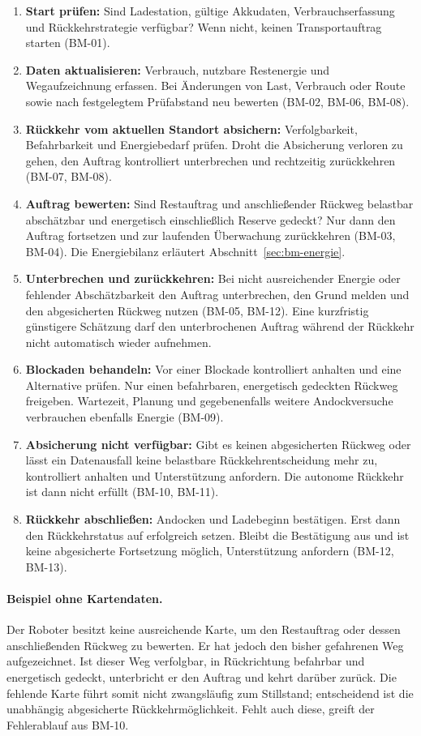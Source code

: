 \begin{enumerate}
    \item \textbf{Start prüfen:} Sind Ladestation, gültige Akkudaten, Verbrauchserfassung und Rückkehrstrategie verfügbar? Wenn nicht, keinen Transportauftrag starten (BM-01).
    \item \textbf{Daten aktualisieren:} Verbrauch, nutzbare Restenergie und Wegaufzeichnung erfassen. Bei Änderungen von Last, Verbrauch oder Route sowie nach festgelegtem Prüfabstand neu bewerten (BM-02, BM-06, BM-08).
    \item \textbf{Rückkehr vom aktuellen Standort absichern:} Verfolgbarkeit, Befahrbarkeit und Energiebedarf prüfen. Droht die Absicherung verloren zu gehen, den Auftrag kontrolliert unterbrechen und rechtzeitig zurückkehren (BM-07, BM-08).
    \item \textbf{Auftrag bewerten:} Sind Restauftrag und anschließender Rückweg belastbar abschätzbar und energetisch einschließlich Reserve gedeckt? Nur dann den Auftrag fortsetzen und zur laufenden Überwachung zurückkehren (BM-03, BM-04). Die Energiebilanz erläutert Abschnitt~\ref{sec:bm-energie}.
    \item \textbf{Unterbrechen und zurückkehren:} Bei nicht ausreichender Energie oder fehlender Abschätzbarkeit den Auftrag unterbrechen, den Grund melden und den abgesicherten Rückweg nutzen (BM-05, BM-12). Eine kurzfristig günstigere Schätzung darf den unterbrochenen Auftrag während der Rückkehr nicht automatisch wieder aufnehmen.
    \item \textbf{Blockaden behandeln:} Vor einer Blockade kontrolliert anhalten und eine Alternative prüfen. Nur einen befahrbaren, energetisch gedeckten Rückweg freigeben. Wartezeit, Planung und gegebenenfalls weitere Andockversuche verbrauchen ebenfalls Energie (BM-09).
    \item \textbf{Absicherung nicht verfügbar:} Gibt es keinen abgesicherten Rückweg oder lässt ein Datenausfall keine belastbare Rückkehrentscheidung mehr zu, kontrolliert anhalten und Unterstützung anfordern. Die autonome Rückkehr ist dann nicht erfüllt (BM-10, BM-11).
    \item \textbf{Rückkehr abschließen:} Andocken und Ladebeginn bestätigen. Erst dann den Rückkehrstatus auf erfolgreich setzen. Bleibt die Bestätigung aus und ist keine abgesicherte Fortsetzung möglich, Unterstützung anfordern (BM-12, BM-13).
\end{enumerate}

\paragraph{Beispiel ohne Kartendaten.}
Der Roboter besitzt keine ausreichende Karte, um den Restauftrag oder dessen anschließenden Rückweg zu bewerten. Er hat jedoch den bisher gefahrenen Weg aufgezeichnet. Ist dieser Weg verfolgbar, in Rückrichtung befahrbar und energetisch gedeckt, unterbricht er den Auftrag und kehrt darüber zurück. Die fehlende Karte führt somit nicht zwangsläufig zum Stillstand; entscheidend ist die unabhängig abgesicherte Rückkehrmöglichkeit. Fehlt auch diese, greift der Fehlerablauf aus BM-10.

